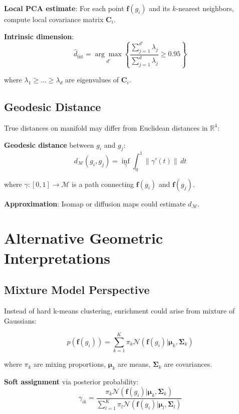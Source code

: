 \documentclass[12pt,letterpaper]{article}
\theoremstyle{definition}
\theoremstyle{remark}
\begin{document}
\textbf{Local PCA estimate}:
For each point $\mathbf{f}(g_i)$ and its $k$-nearest neighbors, compute local covariance matrix $\mathbf{C}_i$.

\textbf{Intrinsic dimension}:
\begin{equation}
\hat{d}_{\text{int}} = \underset{d'}{\arg\max} \left\{ \frac{\sum_{j=1}^{d'} \lambda_j}{\sum_{j=1}^d \lambda_j} \geq 0.95 \right\}
\end{equation}

where $\lambda_1 \geq \ldots \geq \lambda_d$ are eigenvalues of $\mathbf{C}_i$.

\subsection{Geodesic Distance}

True distances on manifold may differ from Euclidean distances in $\mathbb{R}^4$:

\textbf{Geodesic distance} between $g_i$ and $g_j$:
\begin{equation}
d_{\mathcal{M}}(g_i, g_j) = \inf_{\gamma} \int_0^1 \|\gamma'(t)\| \, dt
\end{equation}

where $\gamma : [0,1] \rightarrow \mathcal{M}$ is a path connecting $\mathbf{f}(g_i)$ and $\mathbf{f}(g_j)$.

\textbf{Approximation}: Isomap or diffusion maps could estimate $d_{\mathcal{M}}$.

\section{Alternative Geometric Interpretations}

\subsection{Mixture Model Perspective}

Instead of hard k-means clustering, enrichment could arise from mixture of Gaussians:

\begin{equation}
p(\mathbf{f}(g_i)) = \sum_{k=1}^K \pi_k \mathcal{N}(\mathbf{f}(g_i) | \boldsymbol{\mu}_k, \boldsymbol{\Sigma}_k)
\end{equation}

where $\pi_k$ are mixing proportions, $\boldsymbol{\mu}_k$ are means, $\boldsymbol{\Sigma}_k$ are covariances.

\textbf{Soft assignment} via posterior probability:
\begin{equation}
\gamma_{ik} = \frac{\pi_k \mathcal{N}(\mathbf{f}(g_i) | \boldsymbol{\mu}_k, \boldsymbol{\Sigma}_k)}{\sum_{l=1}^K \pi_l \mathcal{N}(\mathbf{f}(g_i) | \boldsymbol{\mu}_l, \boldsymbol{\Sigma}_l)}
\end{equation}
\end{document}
